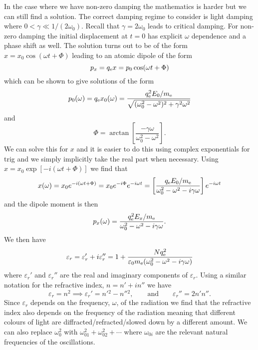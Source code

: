     In the case where we have non-zero damping the mathematics is harder but we can still find a solution.
    The correct damping regime to consider is light damping where \(0 < \gamma \ll 1/(2\omega_0)\).
    Recall that \(\gamma = 2\omega_0\) leads to critical damping.
    For non-zero damping the initial displacement at \(t = 0\) has explicit \(\omega\) dependence and a phase shift as well.
    The solution turns out to be of the form \(x = x_0\cos(\omega t + \Phi)\) leading to an atomic dipole of the form
    \[p_x = q_{\mathrm{e}} x = p_0\cos(\omega t + \Phi)\]
    which can be shown to give solutions of the form
    \[p_0(\omega) = q_{\mathrm{e}} x_0(\omega) = \frac{q_{\mathrm{e}}^2 E_0/m_{\mathrm{e}}}{\sqrt{(\omega_0^2 - \omega^2)^2 + \gamma^2\omega^2}}\]
    and
    \[\Phi = \arctan\left[ \frac{-\gamma\omega}{\omega_0^2 - \omega^2} \right].\] 
    We can solve this for \(x\) and it is easier to do this using complex exponentials for trig and we simply implicitly take the real part when necessary.
    Using \(x = x_0\exp[-i(\omega t + \Phi)]\) we find that
    \[x(\omega) = x_0e^{-i(\omega t + \Phi)} = x_0e^{-i\Phi}e^{-i\omega t} = \left[ \frac{q_{\mathrm{e}} E_0/m_{\mathrm{e}}}{\omega_0^2 - \omega^2 - i\gamma\omega} \right]e^{-i\omega t}\]
    and the dipole moment is then
    \[p_x(\omega) = \frac{q_{\mathrm{e}}^2 E_x/m_{\mathrm{e}}}{\omega_0^2 - \omega^2 - i\gamma \omega}.\]
    We then have
    \begin{equation}\label{eqn:epsilon r oscillator model}
        \varepsilon_r = \varepsilon_r' + i\varepsilon_r'' = 1 + \frac{Nq_{\mathrm{e}}^2}{\varepsilon_0m_{\mathrm{e}} (\omega_0^2 - \omega^2 - i\gamma\omega)}
    \end{equation}
    where \(\varepsilon_r'\) and \(\varepsilon_r''\) are the real and imaginary components of \(\varepsilon_r\).
    Using a similar notation for the refractive index, \(n = n' + in''\) we have
    \[\varepsilon_r = n^2 \implies \varepsilon_r' = n'{^2} - n''{^2}, \qquad\text{and}\qquad \varepsilon_r'' = 2n'n''.\]
    Since \(\varepsilon_r\) depends on the frequency, \(\omega\), of the radiation we find that the refractive index also depends on the frequency of the radiation meaning that different colours of light are diffracted/refracted/slowed down by a different amount.
    We can also replace \(\omega_0^2\) with \(\omega_{01}^2 + \omega_{02}^2 + \dotsb\) where \(\omega_{0i}\) are the relevant natural frequencies of the oscillations.
    
